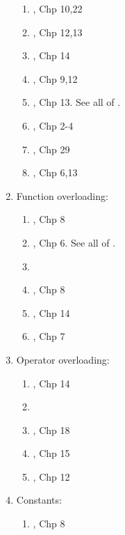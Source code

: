 \begin{enumerate}
	\begin{enumerate} \itemsep -2pt
	\item \cite{Gregoire2014}, Chp 10,22
	\item \cite{Lippman2013}, Chp 12,13
	\item \cite{Allain2012}, Chp 14
	\item \cite{Prata2012}, Chp 9,12
	\item \cite{Gaddis2010}, Chp 13. See all of \cite{Gaddis2010,Gaddis2011,Gaddis2012}.
	\item \cite{Meyers2005}, Chp 2-4
	\item \cite{Schildt2003}, Chp 29
	\item \cite{Eckel2000}, Chp 6,13
	\end{enumerate}
\item Function overloading: \vspace{-0.3cm}
	\begin{enumerate} \itemsep -2pt
	\item \cite{Stroustrup2014}, Chp 8
	\item \cite{Gaddis2010}, Chp 6. See all of \cite{Gaddis2010,Gaddis2011,Gaddis2012}.
	\item \cite[\S4.4, pp. 230--243]{Savitch2009}
	\item \cite{Stroustrup2009}, Chp 8
	\item \cite{Schildt2003}, Chp 14
	\item \cite{Eckel2000}, Chp 7
	\end{enumerate}
\item Operator overloading: \vspace{-0.3cm}
	\begin{enumerate} \itemsep -2pt
	\item \cite{Lippman2013}, Chp 14
	\item \cite[\S11.2, pp. 633--651]{Savitch2009}
	\item \cite{Oualline2003}, Chp 18
	\item \cite{Schildt2003}, Chp 15
	\item \cite{Eckel2000}, Chp 12
	\end{enumerate}
\item Constants: \vspace{-0.3cm}
	\begin{enumerate} \itemsep -2pt
	\item \cite{Eckel2000}, Chp 8
	\end{enumerate}

\end{enumerate}
